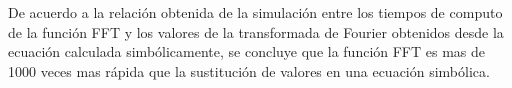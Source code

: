\documentclass[11pt,letterpaper,twocolumn]{article}
\begin{document}
    De acuerdo a la relación obtenida de la simulación entre los tiempos de computo de la función FFT y los valores de la transformada de Fourier obtenidos desde la ecuación calculada simbólicamente, se concluye que la función FFT es mas de 1000 veces mas rápida que la sustitución de valores en una ecuación simbólica.
    
    
    
    





    
\end{document}
